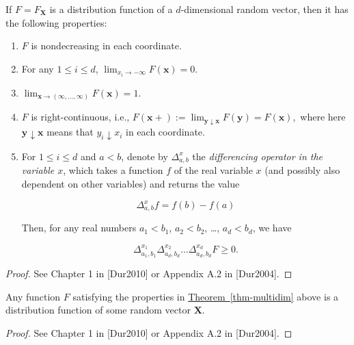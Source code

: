 \begin{thm}
\label{thm-multidim}
If $F=F_{\mathbf X}$ is a distribution function of a
$d$-dimensional random vector, then it has the
following properties:

\begin{enumerate}[label=(\roman*)]
\item $F$ is nondecreasing in each coordinate.

\item For any $1\le i\le d$,
$\lim_{x_i\to-\infty} F(\mathbf{x}) = 0$.

\item $\lim_{\mathbf{x}\to(\infty,\ldots,\infty)}
F(\mathbf{x}) = 1$.

\item $F$ is right-continuous, i.e.,
$F(\mathbf{x}+) := \lim_{\mathbf{y}\downarrow
\mathbf{x}} F(\mathbf{y}) = F(\mathbf{x}),$
where here $\mathbf{y}\downarrow \mathbf{x}$ means
that $y_i\downarrow x_i$ in each coordinate.

\item For $1\le i\le d$ and $a<b$, denote by
$\Delta_{a,b}^{x}$ the \emph{differencing operator in the
variable $x$}, which takes a function $f$ of the real
variable $x$ (and possibly also dependent on other
variables) and returns the value

\[
\Delta_{a,b}^{x}f = f(b) - f(a)
\]

\noindent Then, for any real numbers $a_1 < b_1$, $a_2<b_2$,
\ldots, $a_d < b_d$, we have

\[
\Delta^{x_1}_{a_1,b_1} \Delta^{x_2}_{a_d,b_d}
\ldots \Delta^{x_d}_{a_d,b_d} F \ge 0.
\]
\end{enumerate}

\end{thm}

\begin{proof}
See Chapter 1 in [Dur2010] or Appendix A.2 in
[Dur2004].
\end{proof}

\begin{thm}
Any function $F$ satisfying the properties in \texorpdfstring{\hyperref[thm-multidim]{Theorem~\ref*{thm-multidim}}}{Theorem} above is a distribution function of
some random vector $\mathbf{X}$.
\end{thm}

\begin{proof}
See Chapter 1 in [Dur2010] or Appendix A.2 in
[Dur2004].
\end{proof}

